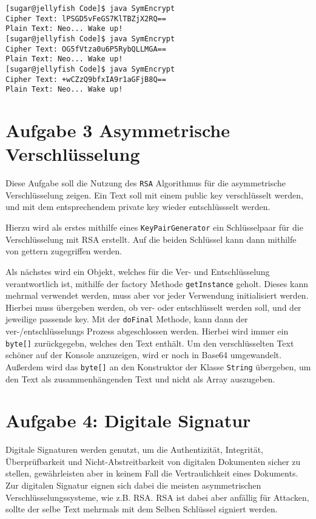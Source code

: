 \documentclass[12pt]{article}
\begin{document}
\begin{lstlisting}
[sugar@jellyfish Code]$ java SymEncrypt 
Cipher Text: lPSGD5vFeGS7KlTBZjX2RQ==
Plain Text: Neo... Wake up!
[sugar@jellyfish Code]$ java SymEncrypt 
Cipher Text: OG5fVtza0u6P5RybQLLMGA==
Plain Text: Neo... Wake up!
[sugar@jellyfish Code]$ java SymEncrypt 
Cipher Text: +wCZzQ9bfxIA9r1aGFjB8Q==
Plain Text: Neo... Wake up!
\end{lstlisting}


\section{Aufgabe 3 Asymmetrische Verschlüsselung}
Diese Aufgabe soll die Nutzung des \texttt{RSA} Algorithmus für die asymmetrische Verschlüsselung zeigen. Ein Text soll mit einem public key verschlüsselt werden, und mit dem entsprechendem private key wieder entschlüssselt werden.

Hierzu wird als erstes mithilfe eines \texttt{KeyPairGenerator} ein Schlüsselpaar für die Verschlüsselung mit RSA erstellt. Auf die beiden Schlüssel kann dann mithilfe von gettern zugegriffen werden.

Als nächstes wird ein Objekt, welches für die Ver- und Entschlüsselung verantwortlich ist, mithilfe der factory Methode \texttt{getInstance} geholt. Dieses kann mehrmal verwendet werden, muss aber vor jeder Verwendung initialisiert werden. Hierbei muss übergeben werden, ob ver- oder entschlüsselt werden soll, und der jeweilige passende key. 
Mit der \texttt{doFinal} Methode, kann dann der ver-/entschlüsselungs Prozess abgeschlossen werden. Hierbei wird immer ein \texttt{byte[]} zurückgegebn, welches den Text enthält. 
Um den verschlüsselten Text schöner auf der Konsole anzuzeigen, wird er noch in Base64 umgewandelt. Außerdem wird das \texttt{byte[]} an den Konstruktor der Klasse \texttt{String} übergeben, um den Text als zusammenhängenden Text und nicht als Array auszugeben.

\section{Aufgabe 4: Digitale Signatur}
Digitale Signaturen werden genutzt, um die Authentizität, Integrität,
Überprüfbarkeit und Nicht-Abstreitbarkeit von digitalen
Dokumenten sicher zu stellen, gewährleisten aber in keinem Fall die Vertraulichkeit eines
Dokuments. Zur digitalen Signatur eignen sich dabei die meisten
asymmetrischen Verschlüsselungssysteme, wie z.B. RSA. RSA ist dabei aber anfällig für
Attacken, sollte der selbe Text mehrmals mit dem Selben Schlüssel signiert
werden.
\end{document}
